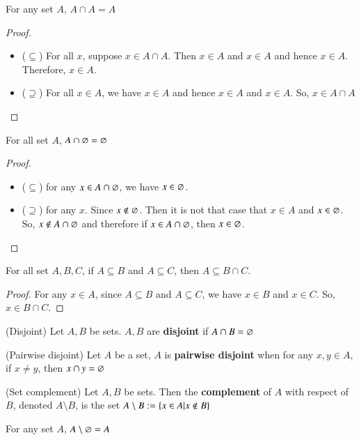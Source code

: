 \begin{prop}
    For any set $A$, $A\cap A = A$
\end{prop}
\begin{proof}
    ~
    \begin{itemize}
        \item ($\subseteq$) For all $x$, suppose $x\in A\cap A$. Then $x\in A$ and $x\in A$ and hence $x\in A$. Therefore, $x\in A$.
        \item ($\supseteq$) For all $x\in A$, we have $x\in A$ and hence $x\in A$ and $x\in A$. So, $x\in A\cap A$ 
    \end{itemize}
\end{proof}
\begin{prop}
    For all set $A$, $A\cap \varnothing = \varnothing$
\end{prop}
\begin{proof}
    ~
    \begin{itemize}
        \item ($\subseteq$) for any $x\in A\cap \varnothing$, we have $x\in \varnothing$.
        \item ($\supseteq$) for any $x$. Since $x\not\in \varnothing$. Then it is not that case that $x\in A$ and $x\in \varnothing$. So, $x\not\in A\cap \varnothing$ and therefore if $x\in A\cap \varnothing$, then $x\in \varnothing$.
    \end{itemize}
\end{proof}
\begin{prop}
    For all set $A,B,C$, if $A\subseteq B$ and $A\subseteq C$, then $A\subseteq B\cap C$.
\end{prop}
\begin{proof}
    For any $x\in A$, since $A\subseteq B$ and $A\subseteq C$, we have $x\in B$ and $x\in C$. So, $x\in B\cap C$. 
\end{proof}
\begin{defn}
    (Disjoint) Let $A,B$ be sets. $A,B$ are \textbf{disjoint} if $A\cap B = \varnothing$
\end{defn}
\begin{defn}
    (Pairwise disjoint) Let $A$ be a set, $A$ is \textbf{pairwise disjoint} when for any $x,y\in A$, if $x\neq y$, then $x\cap y= \varnothing$
\end{defn}
\begin{defn}
    (Set complement) Let $A,B$ be sets. Then the \textbf{complement} of $A$ with respect of $B$, denoted $A\setminus B$, is the set $A\setminus B := \{x\in A|x\not\in B\}$
\end{defn}
\begin{defn}
    For any set $A$, $A\setminus \varnothing = A$
\end{defn}
